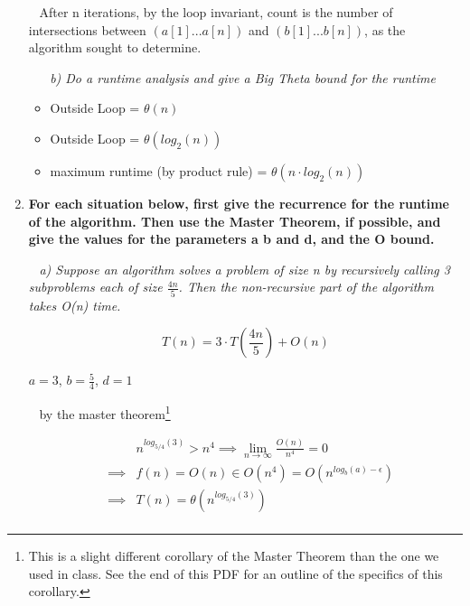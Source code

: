 \documentclass[12pt, letterpaper]{article}
\begin{document}
\begin{enumerate}
    \-\ \newline
    \textnormal{After n iterations, by the loop invariant, count is the number of intersections between \((a[1]...a[n])\) and \((b[1]...b[n]) \), as the algorithm sought to determine.}


    \-\ \newline
    \-\ \newline
    \it{ b) Do a runtime analysis and give a Big Theta bound for the runtime }

    \begin{itemize}
        \item \textnormal{Outside Loop = \(\theta(n)\)}
        \item \textnormal{Outside Loop = \(\theta(log_2(n))\)}
        \item \textnormal{maximum runtime (by product rule) = \(\theta(n \cdot log_2(n))\)}
    \end{itemize} 


    \newpage
    \item 
    \bf{For each situation below, first give the recurrence for the runtime of the algorithm. Then use the Master Theorem, if possible, and give the values for the parameters a b and d, and the O bound.}

    \-\ \newline
    \it{ a) Suppose an algorithm solves a problem of size n by recursively calling 3 subproblems each of size \(\frac{4n}{5}\). Then the non-recursive part of the algorithm takes O(n) time. }

    \[ T(n) = 3 \cdot T(\frac{4n}{5}) + O(n) \]

    \textnormal{ \(a = 3\), \( b = \frac{5}{4} \), \(d = 1\) }

    \-\ \newline
    by the master theorem\footnote{ This is a slight different corollary of the Master Theorem than the one we used in class. See the end of this PDF for an outline of the specifics of this corollary.  }

    \begin{eqnarray}
        && n^{log_{5/4}(3)} > n^{4} \implies \lim_{n \rightarrow \infty} \frac{O(n)}{n^{4}} = 0 \\ 
        &\implies& f(n) = O(n) \in O(n^4) = O(n^{log_b(a) - \epsilon }) \\
        &\implies& T(n) = \theta( n^{log_{5/4}(3)} ) \\
    \end{eqnarray}



\end{enumerate}
\end{document}
